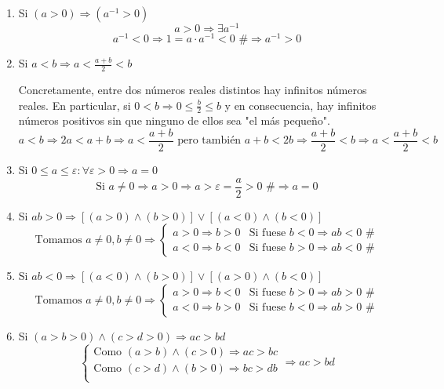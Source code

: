 \documentclass[10pt,a4paper,openright]{book}
\begin{document}
\begin{enumerate}
\item Si $(a>0)\Rightarrow (a^{-1}>0)$
$$a>0\Rightarrow \exists a^{-1}$$
$$a^{-1}<0\Rightarrow 1=a\cdot a^{-1}<0 \mbox{ \#}\Rightarrow a^{-1}>0$$
\vspace{0.5cm}

\item Si $a<b\Rightarrow a<\frac{a+b}{2}<b$\par
Concretamente, entre dos números reales distintos hay infinitos números reales. En particular, si $0<b\Rightarrow 0\leq \frac{b}{2}\leq b$ y en consecuencia, hay infinitos números positivos sin que ninguno de ellos sea "el más pequeño".
$$a<b\Rightarrow 2a<a+b \Rightarrow a<\frac{a+b}{2}\mbox{ pero también }a+b<2b\Rightarrow \frac{a+b}{2}<b \Rightarrow a<\frac{a+b}{2}<b$$
\vspace{0.5cm}

\item Si $0\leq a\leq \varepsilon: \forall \varepsilon>0 \Rightarrow a=0$
$$\mbox{Si }a\neq 0\Rightarrow a>0\Rightarrow a>\varepsilon=\frac{a}{2}>0\mbox{ \#}\Rightarrow a=0$$
\vspace{0.5cm}

\item Si $ab>0\Rightarrow [(a>0)\wedge (b>0)]\vee [(a<0)\wedge (b<0)]$
$$\mbox{Tomamos }a\neq 0, b\neq 0\Rightarrow 
\begin{cases}
a>0 \Rightarrow b>0 & \mbox{Si fuese } b<0\Rightarrow ab<0 \mbox{ \#}\\
a<0 \Rightarrow b<0 & \mbox{Si fuese } b>0\Rightarrow ab<0 \mbox{ \#}
\end{cases}
$$
\vspace{0.5cm}

\item Si $ab<0\Rightarrow [(a<0)\wedge (b>0)]\vee [(a>0)\wedge (b<0)]$
$$\mbox{Tomamos }a\neq 0, b\neq 0\Rightarrow 
\begin{cases}
a>0 \Rightarrow b<0 & \mbox{Si fuese } b>0\Rightarrow ab>0 \mbox{ \#}\\
a<0 \Rightarrow b>0 & \mbox{Si fuese } b<0\Rightarrow ab>0 \mbox{ \#}
\end{cases}
$$
\vspace{0.5cm}

\item Si $(a>b>0)\wedge (c>d>0)\Rightarrow ac>bd$
$$
\begin{cases}
\mbox{Como } (a>b) \wedge (c>0)\Rightarrow ac>bc   \\
\mbox{Como } (c>d) \wedge (b>0)\Rightarrow bc>db   \\
\end{cases}
\Rightarrow ac>bd
$$
\vspace{0.5cm}


\end{enumerate}
\end{document}
